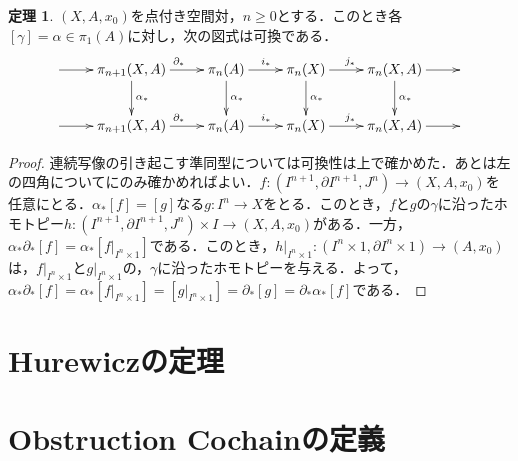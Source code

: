 \documentclass[a4paper,11pt]{jsarticle}
\theoremstyle{definition}
\newtheorem{thm}{定理}[section]
\begin{document}
\begin{thm}
  $(X,A,x_0)$を点付き空間対，$n\ge 0$とする．このとき各$[\gamma]=\alpha\in\pi_1(A)$に対し，次の図式は可換である．
  \[
    \xymatrix{
      \ar[r]
      &\pi_{n+1}(X,A)\ar[r]^{\partial_*}\ar[d]^{\alpha_*}
      &\pi_n(A)\ar[r]^{i_*}\ar[d]^{\alpha_*}
      &\pi_n(X)\ar[r]^{j_*}\ar[d]^{\alpha_*}
      &\pi_n(X,A)\ar[r]\ar[d]^{\alpha_*}
      &\\
      \ar[r]
      &\pi_{n+1}(X,A)\ar[r]^{\partial_*}
      &\pi_n(A)\ar[r]^{i_*}
      &\pi_n(X)\ar[r]^{j_*}
      &\pi_n(X,A)\ar[r]
      &
    }
  \]
\end{thm}
\begin{proof}
  連続写像の引き起こす準同型については可換性は上で確かめた．あとは左の四角についてにのみ確かめればよい．$f\colon (I^{n+1},\partial I^{n+1},J^n)\to (X,A,x_0)$を任意にとる．$\alpha_*[f]=[g]$なる$g\colon I^n\to X$をとる．このとき，$f$と$g$の$\gamma$に沿ったホモトピー$h\colon (I^{n+1},\partial I^{n+1},J^n)\times I\to (X,A,x_0)$がある．一方，$\alpha_*\partial_*[f]=\alpha_*[f|_{I^n\times 1}]$である．このとき，$h|_{I^n\times 1}\colon (I^n\times 1,\partial I^n\times 1)\to (A,x_0)$は，$f|_{I^n\times 1}$と$g|_{I^n\times 1}$の，$\gamma$に沿ったホモトピーを与える．よって，$\alpha_*\partial_*[f]=\alpha_*[f|_{I^n\times 1}]=[g|_{I^n\times 1}]=\partial_*[g]=\partial_*\alpha_*[f]$である．
\end{proof}
\section{Hurewiczの定理}
\section{Obstruction Cochainの定義}
\end{document}
